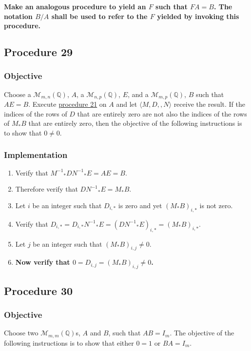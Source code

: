 \documentclass[twocolumn]{article}
\begin{document}
			\textbf{Make an analogous procedure to yield an $F$ such that $FA=B$. The notation $B/A$ shall be used to refer to the $F$ yielded by invoking this procedure.}
		\subsection{Procedure 29}\label{sec:procedure 29}
			\subsubsection{Objective}
				Choose a $\mathcal{M}_{m,n}(\mathbb{Q})$, $A$, a $\mathcal{M}_{n,p}(\mathbb{Q})$, $E$, and a $\mathcal{M}_{m,p}(\mathbb{Q})$, $B$ such that $AE=B$. Execute \hyperref[sec:procedure 21]{procedure 21} on $A$ and let $\langle M,D,,N\rangle$ receive the result. If the indices of the rows of $D$ that are entirely zero are not also the indices of the rows of $M_*B$ that are entirely zero, then the objective of the following instructions is to show that $0\ne 0$.
			\subsubsection{Implementation}
				\begin{enumerate}
					\item Verify that ${M^{-1}}_*D{N^{-1}}_*E=AE=B$.
					\item Therefore verify that $D{N^{-1}}_*E=M_*B$.
					\item Let $i$ be an integer such that $D_{i,*}$ is zero and yet $(M_*B)_{i,*}$ is not zero.
					\item Verify that $D_{i,*}=D_{i,*}{N^{-1}}_*E=(D{N^{-1}}_*E)_{i,*}=(M_*B)_{i,*}$.
					\item Let $j$ be an integer such that $(M_*B)_{i,j}\ne 0$.
					\item \textbf{Now verify that $0=D_{i,j}=(M_*B)_{i,j}\ne 0$.}
				\end{enumerate}
		\subsection{Procedure 30}\label{sec:procedure 30}
			\subsubsection{Objective}
				Choose two $\mathcal{M}_{m,m}(\mathbb{Q})$s, $A$ and $B$, such that $AB=I_m$. The objective of the following instructions is to show that either $0=1$ or $BA=I_m$.
\end{document}
